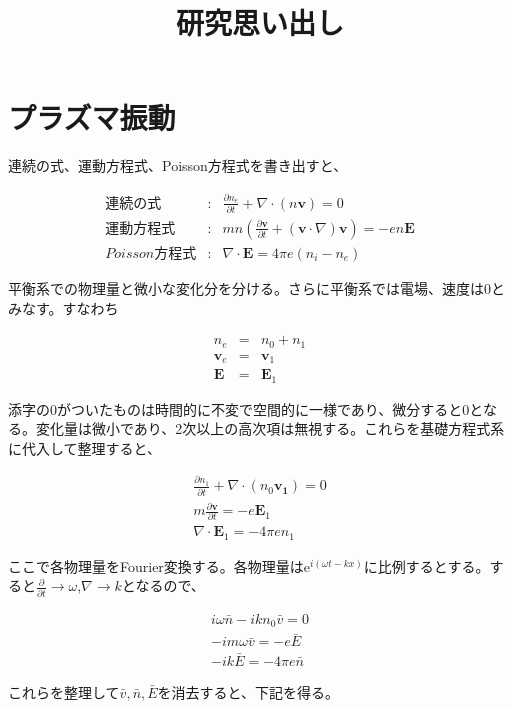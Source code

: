 \documentclass[18pt]{jsarticle}
\title{研究思い出し}
\begin{document}
\section{プラズマ振動}
\par 連続の式、運動方程式、Poisson方程式を書き出すと、

\begin{eqnarray}
    \label{continuous} 連続の式 &:& \frac{\partial n_e}{\partial t} +
        \nabla\cdot (n\bm{v}) = 0 \\
    \label{motion} 運動方程式 &:& mn\left( \frac{\partial \bm{v}}{\partial t}+
      (\bm{v}\cdot\nabla)\bm{v}\right) = -en\bm{E} \\
    \label{poisson} Poisson方程式 &:& \nabla\cdot\bm{E}=4\pi e(n_i-n_e)
\end{eqnarray}

\par 平衡系での物理量と微小な変化分を分ける。さらに平衡系では電場、速度は0とみなす。すなわち

\begin{eqnarray}
    n_e &=& n_0 + n_1 \nonumber \\ 
    \bm{v}_e &=& \bm{v}_1 \nonumber \\
    \bm{E} &=& \bm{E}_1 \nonumber 
\end{eqnarray}

添字の0がついたものは時間的に不変で空間的に一様であり、微分すると0となる。変化量は微小であり、2次以上の高次項は無視する。これらを基礎方程式系に代入して整理すると、

\begin{eqnarray}
    \frac{\partial n_1}{\partial t}+\nabla\cdot(n_0\bm{v_1}) = 0 \\
    m\frac{\partial \bm{v}}{\partial t} = -e\bm{E}_1 \\
    \nabla\cdot\bm{E}_1 = -4\pi en_1
\end{eqnarray}

\par ここで各物理量をFourier変換する。各物理量は$\mathrm{e}^{i(\omega t-kx)}$に比例するとする。すると$\frac{\partial}{\partial t}\rightarrow\omega$,$\nabla\rightarrow k$となるので、

\begin{eqnarray}
    i\omega \bar{n}-ikn_0 \bar{v} = 0 \\
    -im\omega\bar{v} = -e\bar{E} \\
    -ik\bar{E}=-4\pi e\bar{n}
\end{eqnarray}

これらを整理して$\bar{v},\bar{n},\bar{E}$を消去すると、下記を得る。
\end{document}
